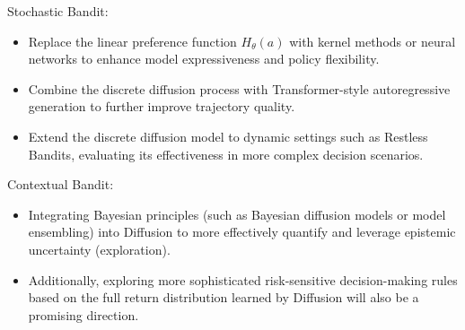 Stochastic Bandit:
\begin{itemize}
  \item Replace the linear preference function $H_{\theta}(a)$ with kernel methods or neural networks to enhance model expressiveness and policy flexibility.
  \item Combine the discrete diffusion process with Transformer-style autoregressive generation to further improve trajectory quality.
  \item Extend the discrete diffusion model to dynamic settings such as Restless Bandits, evaluating its effectiveness in more complex decision scenarios.
\end{itemize}


Contextual Bandit:
\begin{itemize}
    \item Integrating Bayesian principles (such as Bayesian diffusion models or model ensembling) into Diffusion to more effectively quantify and leverage epistemic uncertainty (exploration).
    
    \item Additionally, exploring more sophisticated risk-sensitive decision-making rules based on the full return distribution learned by Diffusion will also be a promising direction.
\end{itemize}